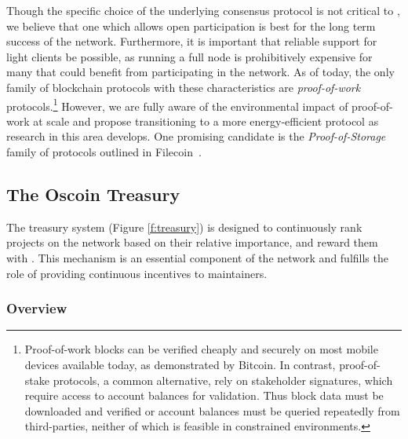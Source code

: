 Though the specific choice of the underlying consensus protocol is not
critical to \oscoin{}, we believe that one which allows open
participation is best for the long term success of the network. Furthermore,
it is important that reliable support for light clients be possible, as
running a full node is prohibitively expensive for many that could
benefit from participating in the \oscoin{} network. As of today, the only family of
blockchain protocols with these characteristics are \emph{proof-of-work}
protocols.\footnote{Proof-of-work blocks
can be verified cheaply and securely on most mobile devices available
today, as demonstrated by Bitcoin. In contrast, proof-of-stake protocols,
a common alternative, rely on stakeholder signatures, which require access to
account balances for validation. Thus block data must be downloaded and
verified or account balances must be queried repeatedly from third-parties,
neither of which is feasible in constrained environments.} However, we are
fully aware of the environmental impact of proof-of-work at
scale and propose transitioning to a more energy-efficient protocol as research in
this area develops. One promising candidate is the \emph{Proof-of-Storage} family of
protocols outlined in Filecoin~\cite{filecoin}.

\begin{figure*}[!ht]
    \par\medskip\noindent\minipage{\linewidth}
    \centering
    
    \caption{The \Oscoin{} Treasury System\label{f:treasury}}
    \endminipage\par\medskip
\end{figure*}

\subsection{The Oscoin Treasury}
\label{s:treasury}

The treasury system (Figure \ref{f:treasury}) is designed to continuously
rank projects on the network based on their relative importance, and reward them with
\oscoin{}. This mechanism is an essential component of the network and fulfills the
role of providing continuous incentives to maintainers.

\subsubsection{Overview}

